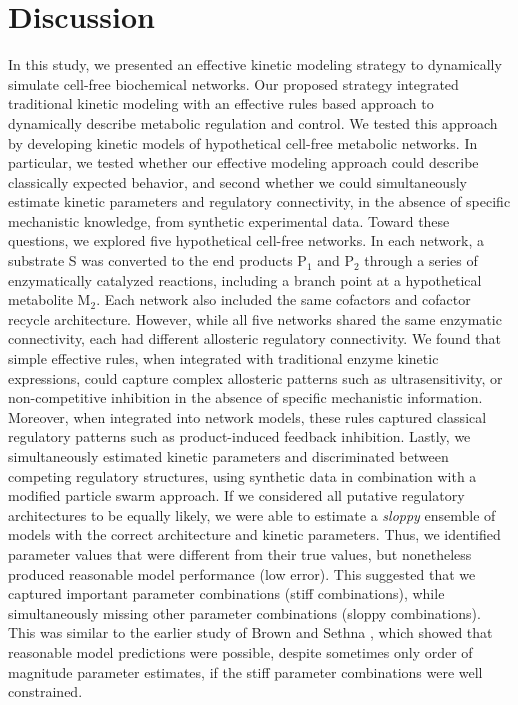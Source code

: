 \documentclass[processes,article,accept,moreauthors,pdftex,12pt,a4paper]{mdpi}
\begin{document}
\section{Discussion}

In this study, we presented an effective kinetic modeling strategy to dynamically simulate cell-free biochemical networks. 
Our proposed strategy integrated traditional kinetic modeling with an effective rules based approach to dynamically describe metabolic regulation and control. 
We tested this approach by developing kinetic models of hypothetical cell-free metabolic networks. 
In particular, we tested whether our effective modeling approach could describe classically expected behavior, and second whether we could simultaneously estimate kinetic parameters and regulatory connectivity, in the absence of specific mechanistic knowledge, from synthetic experimental data. 
Toward these questions, we explored five hypothetical cell-free networks. 
In each network, a substrate S was converted to the end products P$_{1}$ and P$_{2}$ through a series of enzymatically catalyzed reactions, including a branch point at a hypothetical metabolite M$_{2}$. 
Each network also included the same cofactors and cofactor recycle architecture. 
However, while all five networks shared the same enzymatic connectivity, each had different allosteric regulatory connectivity. 
We found that simple effective rules, when integrated with traditional enzyme kinetic expressions, could capture complex allosteric patterns such as ultrasensitivity, or non-competitive inhibition in the absence of specific mechanistic information. Moreover, when integrated into network models, these rules captured classical regulatory patterns such as product-induced feedback inhibition. 
Lastly, we simultaneously estimated kinetic parameters and discriminated between competing regulatory structures, using synthetic data in combination with a modified particle swarm approach.
If we considered all putative regulatory architectures to be equally likely, we were able to estimate a \textit{sloppy} ensemble of models with the correct architecture and kinetic parameters.
Thus, we identified parameter values that were different from their true values, but nonetheless produced reasonable model performance (low error). This suggested that we captured important parameter combinations (stiff combinations), while simultaneously missing other parameter combinations (sloppy combinations). This was similar to the earlier study of Brown and Sethna \citep{Brown:2003aa}, 
which showed that reasonable model predictions were possible, despite sometimes only order of magnitude parameter estimates, if the stiff parameter combinations were well constrained. 
\end{document}
